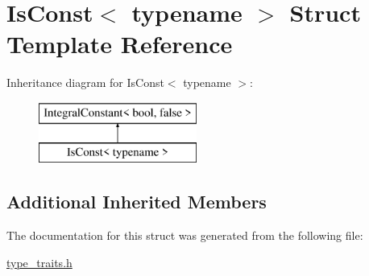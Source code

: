 \hypertarget{struct_is_const}{}\section{Is\+Const$<$ typename $>$ Struct Template Reference}
\label{struct_is_const}
Inheritance diagram for Is\+Const$<$ typename $>$\+:\begin{figure}[H]
\begin{center}
\leavevmode
\includegraphics[height=2.000000cm]{struct_is_const}
\end{center}
\end{figure}
\subsection*{Additional Inherited Members}


The documentation for this struct was generated from the following file\+:\begin{DoxyCompactItemize}
\item 
\hyperlink{type__traits_8h}{type\+\_\+traits.\+h}\end{DoxyCompactItemize}
